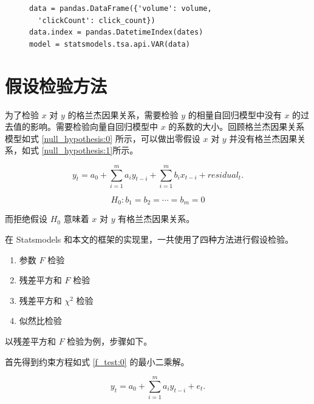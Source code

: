 \begin{figure}
  \begin{minipage}{\textwidth}
    \begin{lstlisting}[caption=落后期选择逻辑, label=auto_regression:2]
data = pandas.DataFrame({'volume': volume,
  'clickCount': click_count})
data.index = pandas.DatetimeIndex(dates)
model = statsmodels.tsa.api.VAR(data)
    \end{lstlisting}
  \end{minipage}
\end{figure}

\section{假设检验方法}

为了检验 $x$ 对 $y$ 的格兰杰因果关系，需要检验 $y$ 的相量自回归模型中没有 $x$ 的过去值的影响。需要检验向量自回归模型中 $x$ 的系数的大小。回顾格兰杰因果关系模型如式 \ref{null_hypothesis:0} 所示，可以做出零假设 $x$ 对 $y$ 并没有格兰杰因果关系，如式 \ref{null_hypothesis:1}所示。

\begin{equation}
  \label{null_hypothesis:0}
  y_{t}=a_{0}+\sum_{i=1}^{m}a_{i}y_{t-i}+\sum_{i=1}^{m}b_{i}x_{t-i}+residual_{t}.
\end{equation}

\begin{equation}
  \label{null_hypothesis:1}
  H_{0}:b_{1}=b_{2}=\cdots =b_{m}=0
\end{equation}

而拒绝假设 $H_{0}$ 意味着 $x$ 对 $y$ 有格兰杰因果关系。

在 Statsmodels 和本文的框架的实现里，一共使用了四种方法进行假设检验。

\begin{enumerate}
  \item 参数 $F$ 检验
  \item 残差平方和 $F$ 检验
  \item 残差平方和 $\chi^{2}$ 检验
  \item 似然比检验
\end{enumerate}

以残差平方和 $F$ 检验为例，步骤如下。

首先得到约束方程如式 \ref{f_test:0} 的最小二乘解。

\begin{equation}
  \label{f_test:0}
  y_t=a_{0}+\sum_{i=1}^{m}a_{i}y_{t-i}+e_{t}.
\end{equation}


